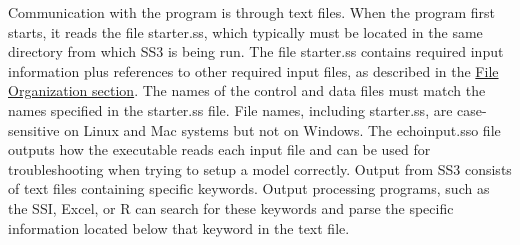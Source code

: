 Communication with the program is through text files. When the program first starts, it reads the file starter.ss, which typically must be located in the same directory from which SS3 is being run. The file starter.ss contains required input information plus references to other required input files, as described in the \hyperref[sec:FileOrganization]{File Organization section}. The names of the control and data files must match the names specified in the starter.ss file. File names, including starter.ss, are case-sensitive on Linux and Mac systems but not on Windows. The echoinput.sso file outputs how the executable reads each input file and can be used for troubleshooting when trying to setup a model correctly. Output from SS3 consists of text files containing specific keywords. Output processing programs, such as the SSI, Excel, or R can search for these keywords and parse the specific information located below that keyword in the text file.

\pagebreak
